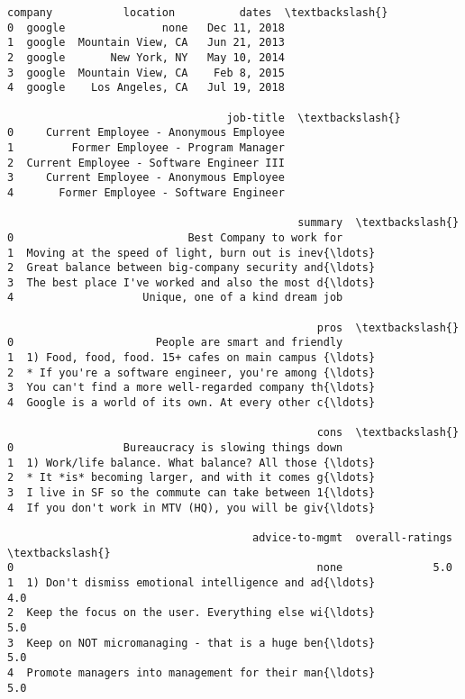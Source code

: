 \documentclass[11pt]{article}
\makeatletter
\newcommand{\boxspacing}{\kern\kvtcb@left@rule\kern\kvtcb@boxsep}
\newcommand{\prompt}[4]{
        \ttfamily\llap{{\color{#2}[#3]:\hspace{3pt}#4}}\vspace{-\baselineskip}
    }
\makeatother
\begin{document}
            \begin{tcolorbox}[breakable, size=fbox, boxrule=.5pt, pad at break*=1mm, opacityfill=0]
\prompt{Out}{outcolor}{225}{\boxspacing}
\begin{Verbatim}[commandchars=\\\{\}]
  company           location          dates  \textbackslash{}
0  google               none   Dec 11, 2018
1  google  Mountain View, CA   Jun 21, 2013
2  google       New York, NY   May 10, 2014
3  google  Mountain View, CA    Feb 8, 2015
4  google    Los Angeles, CA   Jul 19, 2018

                                  job-title  \textbackslash{}
0     Current Employee - Anonymous Employee
1         Former Employee - Program Manager
2  Current Employee - Software Engineer III
3     Current Employee - Anonymous Employee
4       Former Employee - Software Engineer

                                             summary  \textbackslash{}
0                           Best Company to work for
1  Moving at the speed of light, burn out is inev{\ldots}
2  Great balance between big-company security and{\ldots}
3  The best place I've worked and also the most d{\ldots}
4                    Unique, one of a kind dream job

                                                pros  \textbackslash{}
0                      People are smart and friendly
1  1) Food, food, food. 15+ cafes on main campus {\ldots}
2  * If you're a software engineer, you're among {\ldots}
3  You can't find a more well-regarded company th{\ldots}
4  Google is a world of its own. At every other c{\ldots}

                                                cons  \textbackslash{}
0                 Bureaucracy is slowing things down
1  1) Work/life balance. What balance? All those {\ldots}
2  * It *is* becoming larger, and with it comes g{\ldots}
3  I live in SF so the commute can take between 1{\ldots}
4  If you don't work in MTV (HQ), you will be giv{\ldots}

                                      advice-to-mgmt  overall-ratings  \textbackslash{}
0                                               none              5.0
1  1) Don't dismiss emotional intelligence and ad{\ldots}              4.0
2  Keep the focus on the user. Everything else wi{\ldots}              5.0
3  Keep on NOT micromanaging - that is a huge ben{\ldots}              5.0
4  Promote managers into management for their man{\ldots}              5.0


\end{Verbatim}
\end{tcolorbox}
\end{document}
